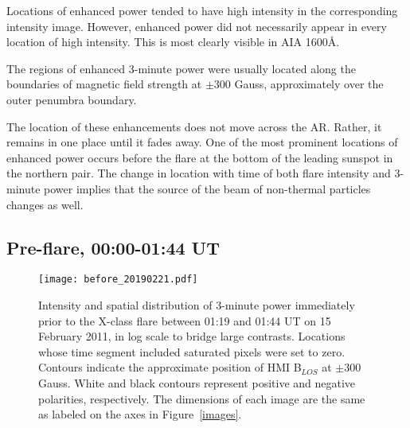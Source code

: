 Locations of enhanced power tended to have high intensity in
the corresponding intensity image.
However, enhanced power did not necessarily appear in
every location of high intensity.
This is most clearly visible in AIA 1600\AA{}.


The regions of enhanced 3-minute power
were usually located along the boundaries of magnetic field
strength at $\pm$300 Gauss,
approximately over the outer penumbra boundary.

The location of these enhancements does not move across the AR.
Rather, it remains in one place until it fades away.
One of the most prominent locations of enhanced power occurs before
the flare at the bottom of the leading sunspot in the northern pair.
The change in location with time of both flare intensity and 3-minute power
implies that the source of the beam of non-thermal particles changes as well.



\subsection{Pre-flare, 00:00-01:44 UT}


\begin{figure*}[htb!]\centering
    \texttt{[image: before\_20190221.pdf]}
    \caption{%
        Intensity and spatial distribution of 3-minute power
        immediately prior to the X-class flare between
        01:19 and 01:44 UT on 15 February 2011,
        in log scale to bridge large contrasts.
        Locations whose time segment included saturated pixels were set to zero.
        Contours indicate the approximate position of
        HMI B$_{LOS}$ at $\pm$300 Gauss. White and black contours represent
        positive and negative polarities, respectively.
        The dimensions of each image are the same as labeled
        on the axes in Figure~\ref{images}.
        \label{before}}
\end{figure*}

